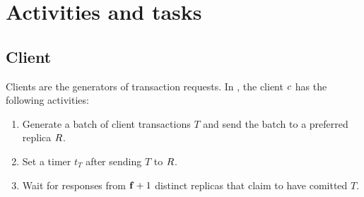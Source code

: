 \section{Activities and tasks}

\subsection{Client}

\par Clients are the generators of transaction requests. In \RCC{}, the client $\Client{}$ has the following activities:

\begin{enumerate}
    \item Generate a batch of client transactions $T$ and send the batch to a preferred replica $\Replica{}$. 
    \item Set a timer $t_T$ after sending $T$ to $\Replica{}$.
    \item Wait for responses from $\mathbf{f}+1$ distinct replicas that claim to have comitted $T$.
\end{enumerate}
